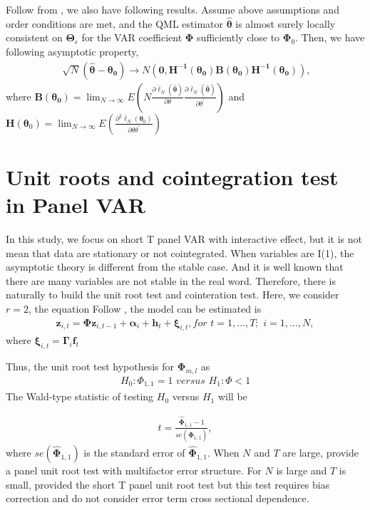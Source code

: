 \documentclass[12pt,a4paper,hyperref]{article}
\begin{document}
Follow from \citep{Hayakawa:2018}, we also have following results.
Assume above assumptions and order conditions are met, and the QML estimator $\boldsymbol{\hat{\theta}}$ is almost surely locally consistent on $\boldsymbol{\Theta}_{\epsilon}$ for the VAR coefficient $\boldsymbol{\Phi}$ sufficiently close to $\boldsymbol{\Phi}_{0}$. Then, we have following asymptotic property,
\begin{align}
\sqrt[]{N}\left( \boldsymbol{\hat{\theta}-\theta_{0}} \right)\rightarrow N\left(\boldsymbol{0, H^{-1}(\theta_{0})}\boldsymbol{B(\theta_{0})} \boldsymbol{H^{-1}(\theta_{0})} \right),
\end{align}
where $\boldsymbol{B(\theta_{0})}=\lim_{N \rightarrow \infty} E (N\frac{\partial\bar{\ell}_{N}\left(\boldsymbol{ \hat{\theta}} \right)}{\partial \theta}\frac{\partial\bar{\ell}_{N}\left(\boldsymbol{ \hat{\theta}} \right)}{\partial \theta^{'}})$ and $\boldsymbol{H}(\boldsymbol{\theta}_{0})=\lim_{N \rightarrow \infty}E(\frac{\partial^{2}\bar{\ell}_{N}\left(\boldsymbol{ \theta}_{0} \right)}{\partial \theta \theta^{'}})$


\section{Unit roots and cointegration test in Panel VAR}
In this study, we focus on short T panel VAR with interactive effect, but it is not mean that data are stationary or not cointegrated. When variables are I(1), the asymptotic theory is different from the stable case. And it is well known that there are many variables are not stable in the real word.
 Therefore, there is naturally to build the unit root test and cointeration test.
Here, we consider $r=2$,  the equation
 Follow  \citet{Binder:2005}, the model can be estimated is
\begin{align}
\boldsymbol{z}_{i,t}=\boldsymbol{\Phi z}_{i,t-1}+\boldsymbol{\alpha}_{i}+\boldsymbol{h}_{t}+\boldsymbol{\xi}_{i,t},  for \,\, t=1,\ldots, T;\,\,i=1,\ldots,N,
\end{align}
where $\boldsymbol{\xi}_{i,t}=\boldsymbol{\Gamma}_{i}\boldsymbol{f}_{t}$

Thus, the unit root test hypothesis
 for $\boldsymbol{\Phi}_{m,l}$ as
 \begin{align}
H_{0}:\Phi_{1,1}=1\,\, versus\,\,H_{1}:\Phi<1
\end{align}
The Wald-type statistic of testing $H_{0}$ versus $H_{1}$ will be

\begin{align}
t=\frac{\hat{\boldsymbol{\Phi}}_{1,1}-1}{se(\hat{\boldsymbol{\Phi}}_{1,1})},
\end{align}
where $se(\hat{\boldsymbol{\Phi}}_{1,1})$ is the standard error of $\hat{\boldsymbol{\Phi}}_{1,1}$.
When $N$ and $T$ are large, \citet{Pesaran:2013} provide a panel unit root test with multifactor error structure.
For $N$ is large and $T$ is small, \citet{Harris:1999} provided the short T panel unit root test but this test requires bias correction and do not consider error term cross sectional dependence.
\end{document}
